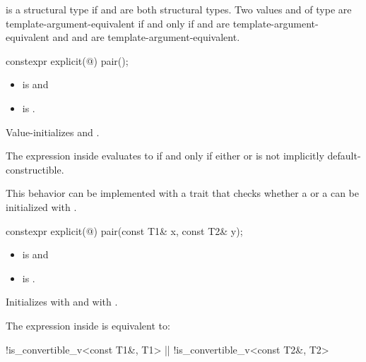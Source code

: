 \documentclass{wg21}
\begin{document}
\pnum
{} is a structural type
if  and  are both structural types.
Two values  and  of type 
are template-argument-equivalent if and only if
 and  are template-argument-equivalent and
 and  are template-argument-equivalent.

%
\begin{itemdecl}
    constexpr explicit(@\seebelow@) pair();
\end{itemdecl}

\begin{itemdescr}
    \pnum
    \constraints
    \begin{itemize}
        \item {} is  and
        \item {} is .
    \end{itemize}
    
    \pnum
    \effects
    Value-initializes  and .
    
    \pnum
    \remarks
    The expression inside  evaluates to 
    if and only if either  or
     is not implicitly default-constructible.
    \begin{note}
        This behavior can be implemented with a trait that checks
        whether a  or a 
        can be initialized with \tcode{\{\}}.
    \end{note}
\end{itemdescr}

%
\begin{itemdecl}
    constexpr explicit(@\seebelow@) pair(const T1& x, const T2& y);
\end{itemdecl}

\begin{itemdescr}
    \pnum
    \constraints
    \begin{itemize}
        \item {} is  and
        \item {} is .
    \end{itemize}
    
    \pnum
    \effects
    Initializes  with  and  with .
    
    \pnum
    \remarks
    The expression inside  is equivalent to:
    \begin{codeblock}
        !is_convertible_v<const T1&, T1> || !is_convertible_v<const T2&, T2>
    \end{codeblock}
\end{itemdescr}
\end{document}
